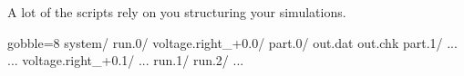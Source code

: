     A lot of the scripts rely on you structuring your simulations.
    \begin{bashcode*}{gobble=8}
        system/
            run.0/
                voltage.right_+0.0/
                    part.0/
                        out.dat
                        out.chk
                    part.1/
                        ...
                    ...
                voltage.right_+0.1/
                ...
            run.1/
            run.2/
            ...
    \end{bashcode*}
